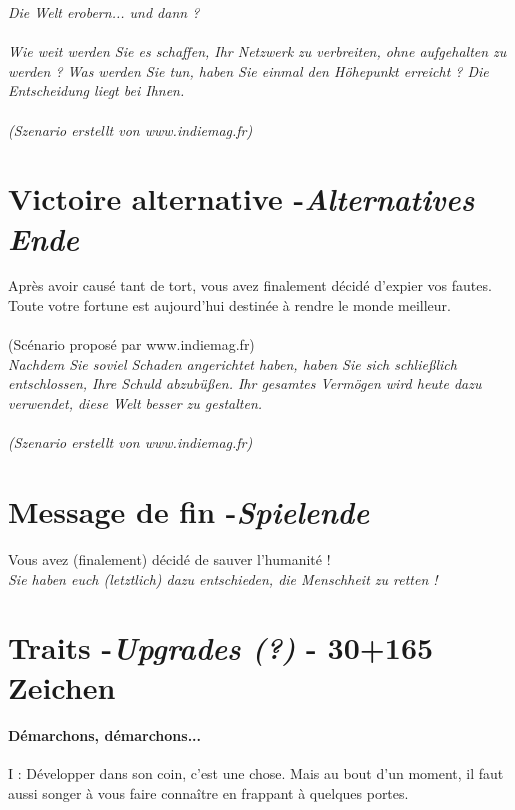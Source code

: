 \documentclass[10pt,a4paper]{article}
\begin{document}
\textit{Die Welt erobern... und dann ?\\ \\ Wie weit werden Sie es schaffen, Ihr Netzwerk zu verbreiten, ohne aufgehalten zu werden ? Was werden Sie tun, haben Sie einmal den Höhepunkt erreicht ? Die Entscheidung liegt bei Ihnen.\\ \\ (Szenario erstellt von www.indiemag.fr)}


\section{Victoire alternative -\emph{Alternatives Ende}}

Après avoir causé tant de tort, vous avez finalement décidé d'expier vos fautes. Toute votre fortune est aujourd'hui destinée à rendre le monde meilleur. \\ \\ (Scénario proposé par www.indiemag.fr)\\

\textit{Nachdem Sie soviel Schaden angerichtet haben, haben Sie sich schlie\ss lich entschlossen, Ihre Schuld abzubü\ss en. Ihr gesamtes Vermögen wird heute dazu verwendet, diese Welt besser zu gestalten. \\ \\ (Szenario erstellt von www.indiemag.fr)}


\section{Message de fin -\emph{Spielende}}

Vous avez (finalement) décidé de sauver l'humanité !\\

\textit{Sie haben euch (letztlich) dazu entschieden, die Menschheit zu retten !}


\section{Traits -\emph{Upgrades (?)} - 30+165 Zeichen}

\paragraph{Démarchons, démarchons...} I : Développer dans son coin, c'est une chose. Mais au bout d'un moment, il faut aussi songer à vous faire connaître en frappant à quelques portes.\\
\end{document}
